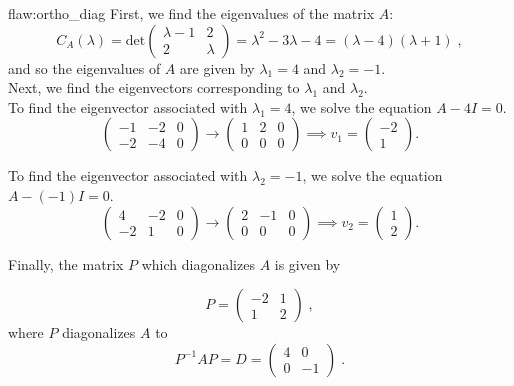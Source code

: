 \begin{flaw}{flaw:ortho_diag} %
First, we find the eigenvalues of the matrix $A$:
$$C_A(\lambda) = \text{det}\begin{pmatrix} \lambda -1 & 2 \\
2 & \lambda \end{pmatrix} = \lambda^2 - 3\lambda -4 = (\lambda - 4)(\lambda +1)\;,$$
and so the eigenvalues of $A$ are given by $\lambda_1 = 4$ and $\lambda_2 = -1.$ \\

Next, we find the eigenvectors corresponding to $\lambda_1$ and $\lambda_2.$\\

To find the eigenvector associated with $\lambda_1 = 4$, we solve the equation $A - 4I = 0.$
$$\left(\begin{array}{cc|c}
-1 &-2 &0 \\
-2 &-4 &0
\end{array}\right) \rightarrow \left(\begin{array}{cc|c}
1 &2 &0 \\
0 &0 &0
\end{array}\right) \implies v_1 = \begin{pmatrix} -2\\
1 \end{pmatrix}.$$

To find the eigenvector associated with $\lambda_2 = -1$, we solve the equation $A - (-1)I = 0$.
$$\left(\begin{array}{cc|c}
4 &-2 &0 \\
-2 &1 &0
\end{array}\right) \rightarrow \left(\begin{array}{cc|c}
2 &-1 &0 \\
0 &0 &0
\end{array}\right) \implies v_2 = \begin{pmatrix} 1\\
2 \end{pmatrix}.$$

Finally, the matrix $P$ which diagonalizes $A$ is given by

$$P = \begin{pmatrix} -2 &1 \\ 1 &2 \end{pmatrix}\;,$$
where $P$ diagonalizes $A$ to
$$P^{-1}AP = D = \begin{pmatrix} 4 &0 \\ 0 &-1 \end{pmatrix}\;.$$
\end{flaw}


